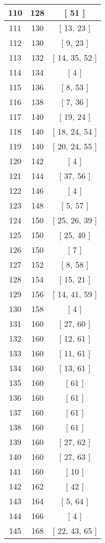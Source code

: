 \begin{center}
\begin{longtable}[H]{|| c c c ||}
\hline
110 & 128 & [ 51 ] \\ 
\hline
111 & 130 & [ 13, 23 ] \\ 
\hline
112 & 130 & [ 9, 23 ] \\ 
\hline
113 & 132 & [ 14, 35, 52 ] \\ 
\hline
114 & 134 & [ 4 ] \\ 
\hline
115 & 136 & [ 8, 53 ] \\ 
\hline
116 & 138 & [ 7, 36 ] \\ 
\hline
117 & 140 & [ 19, 24 ] \\ 
\hline
118 & 140 & [ 18, 24, 54 ] \\ 
\hline
119 & 140 & [ 20, 24, 55 ] \\ 
\hline
120 & 142 & [ 4 ] \\ 
\hline
121 & 144 & [ 37, 56 ] \\ 
\hline
122 & 146 & [ 4 ] \\ 
\hline
123 & 148 & [ 5, 57 ] \\ 
\hline
124 & 150 & [ 25, 26, 39 ] \\ 
\hline
125 & 150 & [ 25, 40 ] \\ 
\hline
126 & 150 & [ 7 ] \\ 
\hline
127 & 152 & [ 8, 58 ] \\ 
\hline
128 & 154 & [ 15, 21 ] \\ 
\hline
129 & 156 & [ 14, 41, 59 ] \\ 
\hline
130 & 158 & [ 4 ] \\ 
\hline
131 & 160 & [ 27, 60 ] \\ 
\hline
132 & 160 & [ 12, 61 ] \\ 
\hline
133 & 160 & [ 11, 61 ] \\ 
\hline
134 & 160 & [ 13, 61 ] \\ 
\hline
135 & 160 & [ 61 ] \\ 
\hline
136 & 160 & [ 61 ] \\ 
\hline
137 & 160 & [ 61 ] \\ 
\hline
138 & 160 & [ 61 ] \\ 
\hline
139 & 160 & [ 27, 62 ] \\ 
\hline
140 & 160 & [ 27, 63 ] \\ 
\hline
141 & 160 & [ 10 ] \\ 
\hline
142 & 162 & [ 42 ] \\ 
\hline
143 & 164 & [ 5, 64 ] \\ 
\hline
144 & 166 & [ 4 ] \\ 
\hline
145 & 168 & [ 22, 43, 65 ] \\ 

\end{longtable}
\end{center}
